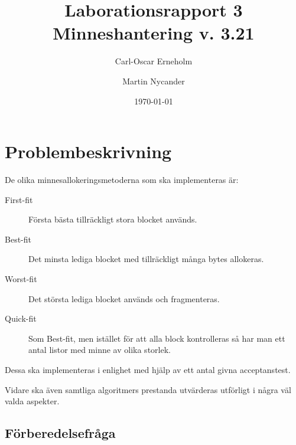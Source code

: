 \documentclass[a4paper,10pt,titlepage]{article}
\title{Laborationsrapport 3 \\ Minneshantering v. 3.21}
\author{Carl-Oscar Erneholm \and Martin Nycander}
\date{\today}
\begin{document}


\maketitle

\tableofcontents
\thispagestyle{empty}
\newpage
\setcounter{page}{1}
\section{Problembeskrivning}

De olika minnesallokeringsmetoderna som ska implementeras är:

\begin{description}
	\item[First-fit] Första bästa tillräckligt stora blocket används.
	\item[Best-fit] Det minsta lediga blocket med tillräckligt många bytes allokeras.
	\item[Worst-fit] Det största lediga blocket används och fragmenteras.
	\item[Quick-fit] Som Best-fit, men istället för att alla block kontrolleras så har man ett antal listor med minne av olika storlek.
\end{description}

Dessa ska implementeras i enlighet med hjälp av ett antal givna acceptanstest.

Vidare ska även samtliga algoritmers prestanda utvärderas utförligt i några väl valda aspekter.

\subsection{Förberedelsefråga}
\end{document}
